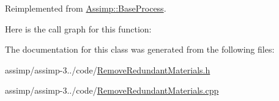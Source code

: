 Reimplemented from \hyperlink{class_assimp_1_1_base_process_aae14d0a8c5918642d4a272b7b74b5d70}{Assimp\+::\+Base\+Process}.



Here is the call graph for this function\+:




The documentation for this class was generated from the following files\+:\begin{DoxyCompactItemize}
\item 
assimp/assimp-\/3../code/\hyperlink{_remove_redundant_materials_8h}{Remove\+Redundant\+Materials.\+h}\item 
assimp/assimp-\/3../code/\hyperlink{_remove_redundant_materials_8cpp}{Remove\+Redundant\+Materials.\+cpp}\end{DoxyCompactItemize}
